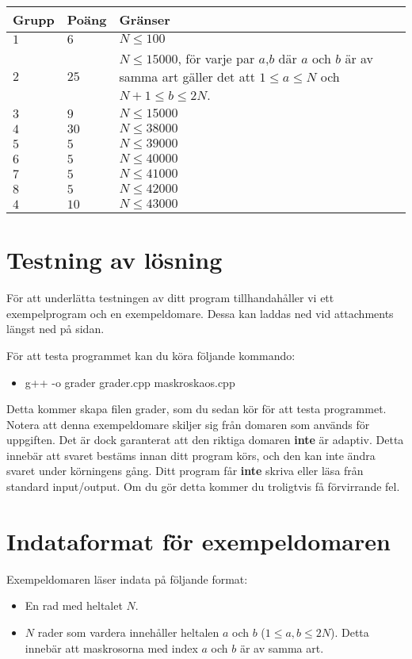 \noindent
\begin{tabular}{| l | l | p{12cm} |}
  \hline
  \textbf{Grupp} & \textbf{Poäng} & \textbf{Gränser} \\ \hline
  $1$    & $6$         & $N \leq 100$  \\ \hline
  $2$    & $25$        & $N \leq 15000$, för varje par $a$,$b$ där $a$ och $b$ är av samma art gäller det att
  $1 \leq a \leq N$ och $N+1 \leq b \leq 2N$. \\ \hline
  $3$    & $9$         & $N \leq 15000$ \\ \hline
  $4$    & $30$        & $N \leq 38000$ \\ \hline
  $5$    & $5$         & $N \leq 39000$ \\ \hline
  $6$    & $5$         & $N \leq 40000$ \\ \hline
  $7$    & $5$         & $N \leq 41000$ \\ \hline
  $8$    & $5$         & $N \leq 42000$ \\ \hline
  $4$    & $10$        & $N \leq 43000$ \\ \hline
\end{tabular}

\section*{Testning av lösning}
För att underlätta testningen av ditt program tillhandahåller vi ett exempelprogram och en exempeldomare. Dessa kan laddas ned
vid attachments längst ned på sidan. 

För att testa programmet kan du köra följande kommando:
\begin{itemize}
  \item g++ -o grader grader.cpp maskroskaos.cpp
\end{itemize}

Detta kommer skapa filen grader, som du sedan kör för att testa programmet. Notera att denna exempeldomare skiljer sig från
domaren som används för uppgiften. Det är dock garanterat att den riktiga domaren \textbf{inte} är adaptiv. Detta innebär
att svaret bestäms innan ditt program körs, och den kan inte ändra svaret under körningens gång. Ditt program får \textbf{inte}
skriva eller läsa från standard input/output. Om du gör detta kommer du troligtvis få förvirrande fel.

\section*{Indataformat för exempeldomaren}
Exempeldomaren läser indata på följande format:
\begin{itemize}
  \item En rad med heltalet $N$.
  \item $N$ rader som vardera innehåller heltalen $a$ och $b$ ($1 \leq a,b \leq 2N$). Detta innebär att maskrosorna med
  index $a$ och $b$ är av samma art. 
\end{itemize}

